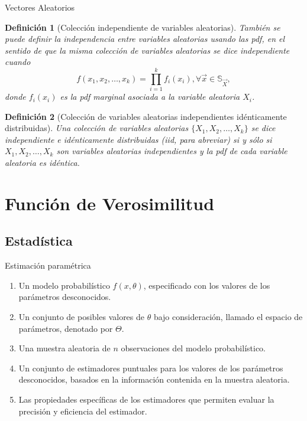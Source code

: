 \documentclass{beamer}
\newtheorem{defi}{Definición}[section]
\begin{document}
\begin{frame}[allowframebreaks]{Vectores Aleatorios}
	\begin{defi}[Colección independiente de variables aleatorias]
	También se puede definir la independencia entre variables aleatorias usando las pdf, en el sentido de que la misma colección de variables aleatorias se dice independiente cuando
	$$f(x_1,x_2,\dots,x_k)=\prod_{i=1}^k f_i(x_i), \forall\vec{x}\in\mathbb{S}_{\vec{X}},$$
	donde $f_i(x_i)$ es la pdf marginal asociada a la variable aleatoria $X_i$.
	
	\end{defi}
	
		\begin{defi}[Colección de variables aleatorias independientes idénticamente distribuidas]
		Una colección de variables aleatorias $\{ X_1,X_2,\dots, X_k\}$ se dice independiente e idénticamente distribuidas (iid, para abreviar) si y sólo si $X_1,X_2,\dots,X_k$ son variables aleatorias independientes y la pdf de cada variable aleatoria es idéntica.
	\end{defi}
	
	\end{frame}
	\section{Función de Verosimilitud}
	\subsection{Estadística}
	\begin{frame}{Estimación paramétrica}
	\begin{enumerate}
			\item Un modelo probabilístico $f(x,\theta)$, especificado con los valores de los parámetros desconocidos.
			\item Un conjunto de posibles valores de $\theta$ bajo consideración, llamado el espacio de parámetros, denotado por $\Theta$.
			\item Una muestra aleatoria de $n$ observaciones del modelo probabilístico.
			\item Un conjunto de estimadores puntuales para los valores de los parámetros desconocidos, basados en la información contenida en la muestra aleatoria.
			\item Las propiedades específicas de los estimadores que permiten evaluar la precisión y eficiencia del estimador.
		\end{enumerate}
	\end{frame}
	
\end{document}
